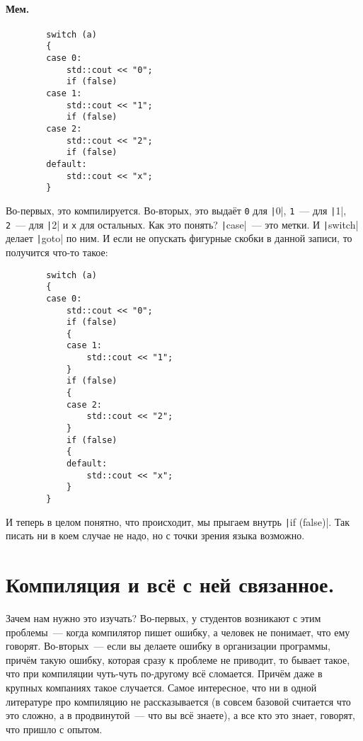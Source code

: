 \documentclass{article}
\begin{document}
    \paragraph{Мем.}
    \begin{verbatim}
        switch (a)
        {
        case 0:
            std::cout << "0";
            if (false)
        case 1:
            std::cout << "1";
            if (false)
        case 2:
            std::cout << "2";
            if (false)
        default:
            std::cout << "x";
        }
    \end{verbatim}
    Во-первых, это компилируется. Во-вторых, это выдаёт \Verb|0| для \texttt|0|, \verb|1|~--- для \texttt|1|, \Verb|2|~--- для \texttt|2| и \Verb|x| для остальных. Как это понять? \texttt|case|~--- это метки. И \texttt|switch| делает \texttt|goto| по ним. И если не опускать фигурные скобки в данной записи, то получится что-то такое:
    \begin{verbatim}
        switch (a)
        {
        case 0:
            std::cout << "0";
            if (false)
            {
            case 1:
                std::cout << "1";
            }
            if (false)
            {
            case 2:
                std::cout << "2";
            }
            if (false)
            {
            default:
                std::cout << "x";
            }
        }
    \end{verbatim}
    И теперь в целом понятно, что происходит, мы прыгаем внутрь \texttt|if (false)|. Так писать ни в коем случае не надо, но с точки зрения языка возможно.
    \section{Компиляция и всё с ней связанное.}
    Зачем нам нужно это изучать? Во-первых, у студентов возникают с этим проблемы~--- когда компилятор пишет ошибку, а человек не понимает, что ему говорят. Во-вторых~--- если вы делаете ошибку в организации программы, причём такую ошибку, которая сразу к проблеме не приводит, то бывает такое, что при компиляции чуть-чуть по-другому всё сломается. Причём даже в крупных компаниях такое случается. Самое интересное, что ни в одной литературе про компиляцию не рассказывается (в совсем базовой считается что это сложно, а в продвинутой~--- что вы всё знаете), а все кто это знает, говорят, что пришло с опытом. 
\end{document}
